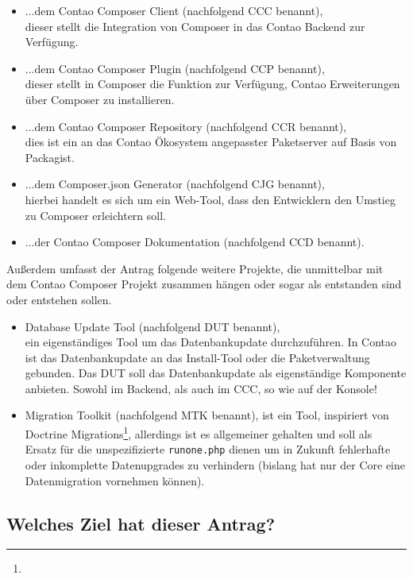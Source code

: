 \documentclass[
paper=a4,
draft=false,%
fontsize=10pt%
]{scrartcl}
\begin{document}
\begin{itemize}
\item ...dem Contao Composer Client (nachfolgend CCC benannt), \\
dieser stellt die Integration von Composer in das Contao Backend zur Verfügung.
\item ...dem Contao Composer Plugin (nachfolgend CCP benannt), \\
dieser stellt in Composer die Funktion zur Verfügung, Contao Erweiterungen über Composer zu installieren.
\item ...dem Contao Composer Repository (nachfolgend CCR benannt), \\
dies ist ein an das Contao Ökosystem angepasster Paketserver auf Basis von Packagist.
\item ...dem Composer.json Generator (nachfolgend CJG benannt), \\
hierbei handelt es sich um ein Web-Tool, dass den Entwicklern den Umstieg zu Composer erleichtern soll.
\item ...der Contao Composer Dokumentation (nachfolgend CCD benannt).
\end{itemize}

Außerdem umfasst der Antrag folgende weitere Projekte, die unmittelbar mit dem Contao Composer Projekt zusammen hängen oder sogar als  entstanden sind oder entstehen sollen.

\begin{itemize}
\item Database Update Tool (nachfolgend DUT benannt), \\
ein eigenständiges Tool um das Datenbankupdate durchzuführen. In Contao ist das Datenbankupdate an das Install-Tool oder die Paketverwaltung gebunden. Das DUT soll das Datenbankupdate als eigenständige Komponente anbieten. Sowohl im Backend, als auch im CCC, so wie auf der Konsole!
\item Migration Toolkit (nachfolgend MTK benannt), ist ein Tool, inspiriert von Doctrine Migrations\footnote{}, allerdings ist es allgemeiner gehalten und soll als Ersatz für die unspezifizierte \texttt{runone.php} dienen um in Zukunft fehlerhafte oder inkomplette Datenupgrades zu verhindern (bislang hat nur der Core eine  Datenmigration vornehmen können).
\end{itemize}

\subsection*{Welches Ziel hat dieser Antrag?}
\end{document}
